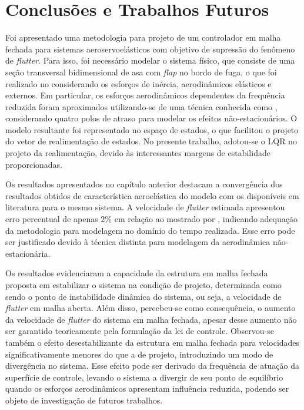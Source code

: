 \chapter{Conclusões e Trabalhos Futuros}\label{cap:conclusões}

Foi apresentado uma metodologia para projeto de um controlador em malha fechada para sistemas aeroservoelásticos com objetivo de supressão do fenômeno de \textit{flutter}. Para isso, foi necessário modelar o sistema físico, que consiste de uma seção transversal bidimensional de asa com \textit{flap} no bordo de fuga, o que foi realizado no considerando os esforços de inércia, aerodinâmicos elásticos e externos. Em particular, os esforços aerodinâmicos dependentes da frequência reduzida foram aproximados utilizando-se de uma técnica conhecida como , considerando quatro polos de atraso para modelar os efeitos não-estacionários. O modelo resultante foi representado no espaço de estados, o que facilitou o projeto do vetor de realimentação de estados. No presente trabalho, adotou-se o \gls{LQR} no projeto da realimentação, devido às interessantes margens de estabilidade proporcionadas.

Os resultados apresentados no capítulo anterior destacam a convergência dos resultados obtidos de característica aeroelástica do modelo com os disponíveis em literatura para o mesmo sistema. A velocidade de \textit{flutter} estimada apresentou erro percentual de apenas $2\%$ em relação ao mostrado por \textcite{book:Fung}, indicando adequação da metodologia para modelagem no domínio do tempo realizada. Esse erro pode ser justificado devido à técnica distinta para modelagem da aerodinâmica não-estacionária.

Os resultados evidenciaram a capacidade da estrutura em malha fechada proposta em estabilizar o sistema na condição de projeto, determinada como sendo o ponto de instabilidade dinâmica do sistema, ou seja, a velocidade de \textit{flutter} em malha aberta. Além disso, percebeu-se como consequência, o aumento da velocidade de \textit{flutter} do sistema em malha fechada, apesar desse aumento não ser garantido teoricamente pela formulação da lei de controle. Observou-se também o efeito desestabilizante da estrutura em malha fechada para velocidades significativamente menores do que a de projeto, introduzindo um modo de divergência no sistema. Esse efeito pode ser derivado da frequência de atuação da superfície de controle, levando o sistema a divergir de seu ponto de equilíbrio quando os esforços aerodinâmicos apresentam influência reduzida, podendo ser objeto de investigação de futuros trabalhos.


